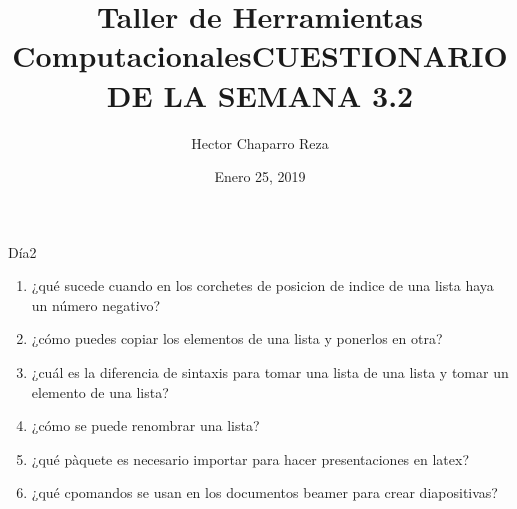 \documentclass[letterpaper, 12pt, oneside]{article}
\title{\Huge{Taller de Herramientas Computacionales}}
\author{Hector Chaparro Reza}
\date{Enero 25, 2019}
\begin{document}
	\title{\Huge{CUESTIONARIO DE LA SEMANA 3.2}}	
	Día2
	\begin{enumerate}
		\item ¿qué sucede cuando en los corchetes de posicion de indice de una lista haya un número negativo?
		\item ¿cómo puedes copiar los elementos de una lista y ponerlos en otra?
		\item ¿cuál es la diferencia de sintaxis para tomar una lista de una lista y tomar un elemento de una lista?
		\item ¿cómo se puede renombrar una lista?
		\item ¿qué pàquete es necesario importar para hacer presentaciones en latex?
		\item ¿qué cpomandos se usan en los documentos beamer para crear diapositivas?
	\end{enumerate}
\end{document}
